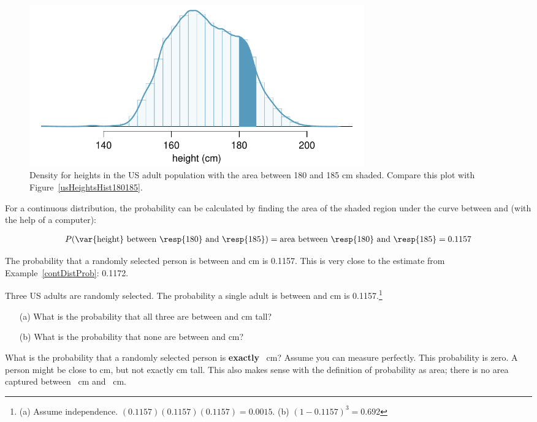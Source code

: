 \begin{figure}
	\centering
	\includegraphics[width=0.7\textwidth]{ch_probability_oi_biostat/figures/fdicHeightContDistFilled/fdicHeightContDistFilled}
	\caption{Density for heights in the US adult population with the area between 180 and 185 cm shaded. Compare this plot with Figure~\ref{usHeightsHist180185}.}
	\label{fdicHeightContDistFilled}
\end{figure}

For a continuous distribution, the probability can be calculated by finding the area of the shaded region under the curve between  and  (with the help of a computer):

\begin{eqnarray*}
P(\text{\var{height} between \resp{180} and \resp{185}})
	= \text{area between \resp{180} and \resp{185}}
	= 0.1157
\end{eqnarray*}

The probability that a randomly selected person is between  and  cm is 0.1157. This is very close to the estimate from Example~\ref{contDistProb}: 0.1172. 

\begin{exercise}
Three US adults are randomly selected. The probability a single adult is between  and  cm is 0.1157.\footnote{(a) Assume independence. $(0.1157)  (0.1157) (0.1157) = 0.0015$. (b) $(1-0.1157)^3 = 0.692$} \vspace{-1.5mm}
\begin{enumerate}
\setlength{\itemsep}{0mm}
\item[(a)] What is the probability that all three are between  and  cm tall?
\item[(b)] What is the probability that none are between  and  cm?
\end{enumerate}
\end{exercise}

\begin{example}{What is the probability that a randomly selected person is \textbf{exactly} ~cm? Assume you can measure perfectly.}
\label{probabilityOfExactly180cm}
This probability is zero. A person might be close to  cm, but not exactly  cm tall. This also makes sense with the definition of probability as area; there is no area captured between ~cm and ~cm.
\end{example}

